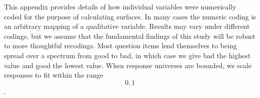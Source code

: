 
This appendix provides details of how individual variables were numerically
coded for the purpose of calculating surfaces. In many cases the numeric coding
is an arbitrary mapping of a qualitative variable. Results may vary under
different codings, but we assume that the fundamental findings of this study
will be robust to more thoughtful recodings. Most question items lend themselves
to being spread over a spectrum from good to bad, in which case we give bad the
highest value and good the lowest value. When response universes are bounded, we
scale responses to fit within the range \[0,1\].




